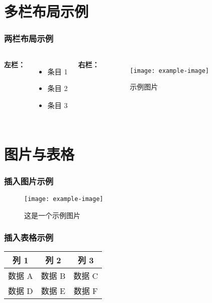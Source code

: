 \documentclass[aspectratio=169]{beamer}
\begin{document}
\section{多栏布局示例}
\begin{frame}
    \frametitle{两栏布局示例}
    \begin{columns}[T] %
            \textbf{左栏：}
            \begin{itemize}
                \item 条目 1
                \item 条目 2
                \item 条目 3
            \end{itemize}
            \textbf{右栏：}
            \begin{figure}
                \texttt{[image: example-image]} %
                \caption{示例图片}
            \end{figure}
    \end{columns}
\end{frame}

\section{图片与表格}
\begin{frame}
    \frametitle{插入图片示例}
    \begin{figure}
        \centering
        \texttt{[image: example-image]}
        \caption{这是一个示例图片}
    \end{figure}
\end{frame}

\begin{frame}
    \frametitle{插入表格示例}
    \begin{center}
    \begin{tabular}{|c|c|c|}
        \hline
        列 1 & 列 2 & 列 3 \\
        \hline
        数据 A & 数据 B & 数据 C \\
        \hline
        数据 D & 数据 E & 数据 F \\
        \hline
    \end{tabular}
    \end{center}
\end{frame}
\end{document}
